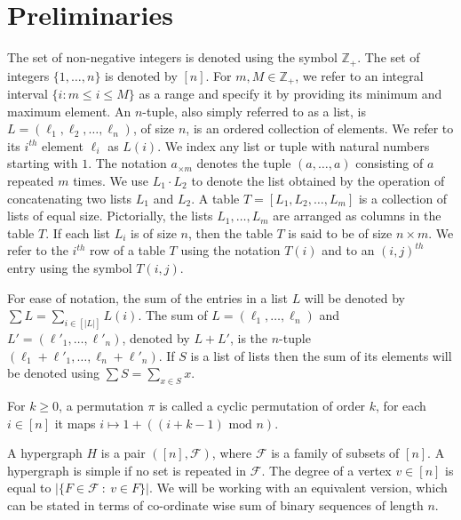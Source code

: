 \section{Preliminaries}
The set of non-negative integers is denoted using the symbol $\mathbb{Z}_+$.
The set of integers $\{1,\dots,n\}$ is denoted by $[n]$. For $m, M\in \mathbb{Z}_+$, we refer to an integral interval $\{i : m\leq i\leq M\}$ as a range and specify it by providing its minimum and maximum element.
An $n$-tuple, also simply referred to as a list, is $L=(\ell_1,\ell_2,\dots,\ell_n)$, of size $n$, is an ordered collection of elements. We refer to its $i^{th}$ element $\ell_i$ as $L(i)$. We index any list or tuple with natural numbers starting with $1$.
The notation $a_{\times m}$ denotes the tuple
$(a,\dots,a)$ consisting of $a$ repeated $m$ times.
We use $L_1 \cdot L_2$ to denote the list obtained by the operation of concatenating two lists $L_1$ and $L_2$.
A table $T=[L_1,L_2,\dots,L_m]$ is a collection of lists of equal size. Pictorially, the lists $L_1,\dots,L_m$ are arranged as columns in the table $T$. If each list $L_i$ is of size $n$, then the table $T$ is said to be of size $n\times m$. We refer to the $i^{th}$ row of a table $T$ using the notation $T(i)$ and to an $(i,j)^{th}$ entry using the symbol $T(i,j)$.

For ease of notation, the sum of the entries in a list $L$ will be denoted by $\sum L = \sum_{i\in [\vert L\vert]} L(i)$.
The sum of $L=(\ell_1,\dots,\ell_n)$ and $L'=(\ell'_1,\dots,\ell'_n)$, denoted by $L+L'$, is the $n$-tuple $(\ell_1+\ell'_1,\dots,\ell_n+\ell'_n)$. If $S$ is a list of lists then the sum of its elements will be denoted using $\sum S = \sum_{x\in S} x$.


For $k\geq 0$, a permutation $\pi$ is called a cyclic permutation of order $k$, for each $i\in [n]$ it maps $i \mapsto 1+((i+k-1)\mbox{ mod }n)$.

A hypergraph $H$ is a pair $([n],\mathcal{F})$, where $\mathcal{F}$ is a family of subsets of $[n]$. A hypergraph is simple if no set is repeated in $\mathcal{F}$. The degree of a vertex $v\in[n]$ is equal to $\vert\{F\in\mathcal{F}~:~v\in F\}\vert$.
We will be working with an equivalent version, which can be stated in terms of co-ordinate wise sum of binary sequences of length $n$.


